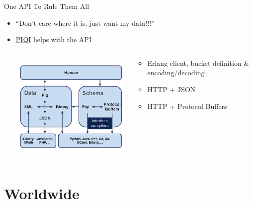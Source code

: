 \documentclass[aspectratio=169]{beamer}
\begin{document}
\begin{frame}{One API To Rule Them All}
    \begin{itemize}
        \item ``Don't care where it is, just want my data!!!''
        \pause
        \item \href{http://piqi.org}{PIQI} helps with the API
        \begin{columns}
            \begin{column}[c]{0.3\textwidth}
                \includegraphics[width=\textwidth]{images/piqi.png}
            \end{column}
            \begin{column}[c]{0.6\textwidth}
                \begin{itemize}
                    \item Erlang client, bucket definition \& encoding/decoding
                    \item HTTP + JSON
                    \item HTTP + Protocol Buffers
                \end{itemize}
            \end{column}
        \end{columns}
    \end{itemize}
\end{frame}

\section{Worldwide}
\end{document}
